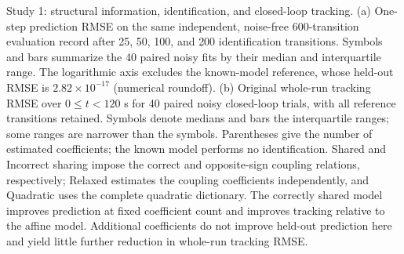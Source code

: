 \caption{Study 1: structural information, identification, and closed-loop tracking.
(a) One-step prediction RMSE on the same independent, noise-free
600-transition evaluation record after 25, 50, 100, and 200 identification
transitions. Symbols and bars summarize the 40 paired noisy fits by their
median and interquartile range. The logarithmic axis excludes the known-model
reference, whose held-out RMSE is $2.82 \times 10^{-17}$ (numerical roundoff).
(b) Original whole-run tracking RMSE over $0 \leq t < 120$ s for
40 paired noisy closed-loop trials, with all reference transitions retained.
Symbols denote medians and bars the interquartile ranges; some ranges are
narrower than the symbols. Parentheses give the number of estimated
coefficients; the known model performs no identification.
Shared and Incorrect sharing impose the correct and opposite-sign coupling
relations, respectively; Relaxed estimates the coupling coefficients
independently, and Quadratic uses the complete quadratic dictionary.
The correctly shared model improves prediction at fixed coefficient count
and improves tracking relative to the affine model. Additional coefficients
do not improve held-out prediction here and yield little further reduction
in whole-run tracking RMSE.}
